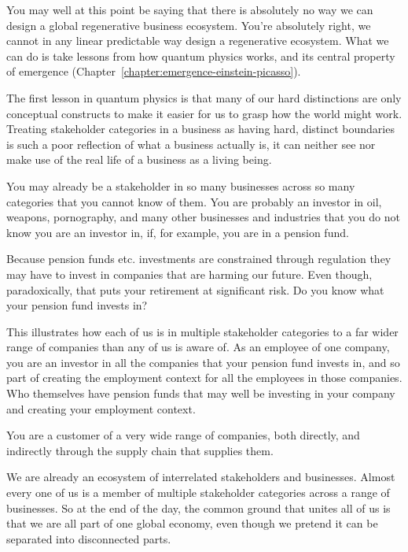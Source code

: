 You may well at this point be saying that there is absolutely no way we can design a global regenerative business ecosystem. You're absolutely right, we cannot in any linear predictable way design a regenerative ecosystem. What we can do is take lessons from how quantum physics works, and its central property of emergence (Chapter~\ref{chapter:emergence-einstein-picasso}). 


The first lesson in quantum physics is that many of our hard distinctions are only conceptual constructs to make it easier for us to grasp how the world might work. Treating stakeholder categories in a business as having hard, distinct boundaries is such a poor reflection of what a business actually is, it can neither see nor make use of the real life of a business as a living being.


You may already be a stakeholder in so many businesses across so many categories that you cannot know of them. You are probably an investor in oil, weapons, pornography, and many other businesses and industries that you do not know you are an investor in, if, for example, you are in a pension fund. 


Because pension funds etc. investments are constrained  through regulation they may have to invest in companies that are harming our future. Even though, paradoxically, that puts your retirement at significant risk. Do you know what your pension fund invests in?


This illustrates how each of us is in multiple stakeholder categories to a far wider range of companies than any of us is aware of. As an employee of one company, you are an investor in all the companies that your pension fund invests in, and so part of creating the employment context for all the employees in those companies. Who themselves have pension funds that may well be investing in your company and creating your employment context.


You are a customer of a very wide range of companies, both directly, and indirectly through the supply chain that supplies them. 


We are already an ecosystem of interrelated stakeholders and businesses.  Almost every one of us is a member of multiple stakeholder categories across a range of businesses. So at the end of the day, the common ground that unites all of us is that we are all part of one global economy, even though we pretend it can be separated into disconnected parts.


